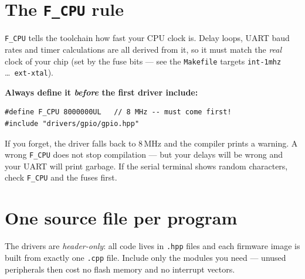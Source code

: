 \documentclass[11pt,a4paper]{article}
\begin{document}
\section{The \texttt{F\_CPU} rule}

\texttt{F\_CPU} tells the toolchain how fast your CPU clock is. Delay loops,
UART baud rates and timer calculations are all derived from it, so it must
match the \emph{real} clock of your chip (set by the fuse bits --- see the
\texttt{Makefile} targets \texttt{int-1mhz} \dots\ \texttt{ext-xtal}).

\textbf{Always define it \emph{before} the first driver include:}

\begin{lstlisting}
#define F_CPU 8000000UL   // 8 MHz -- must come first!
#include "drivers/gpio/gpio.hpp"
\end{lstlisting}

If you forget, the driver falls back to 8\,MHz and the compiler prints a
warning. A wrong \texttt{F\_CPU} does not stop compilation --- but your
delays will be wrong and your UART will print garbage. If the serial
terminal shows random characters, check \texttt{F\_CPU} and the fuses first.

\section{One source file per program}

The drivers are \emph{header-only}: all code lives in \texttt{.hpp} files and
each firmware image is built from exactly one \texttt{.cpp} file. Include
only the modules you need --- unused peripherals then cost no flash memory
and no interrupt vectors.
\end{document}
